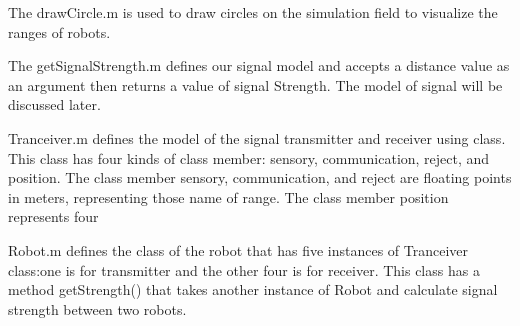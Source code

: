 The drawCircle.m is used to draw circles on the simulation field to visualize the ranges of robots.

The getSignalStrength.m defines our signal model and accepts a distance value as an argument then returns a value of signal Strength. The model of signal will be discussed later.

Tranceiver.m defines the model of the signal transmitter and receiver using class. This class has four kinds of class member: sensory, communication, reject, and position. The class member sensory, communication, and reject are floating points in meters, representing those name of range. The class member position represents four 

Robot.m defines the class of the robot that has five instances of Tranceiver class:one is for transmitter and the other four is for receiver. This class has a method getStrength() that takes another instance of Robot and calculate signal strength between two robots. 

